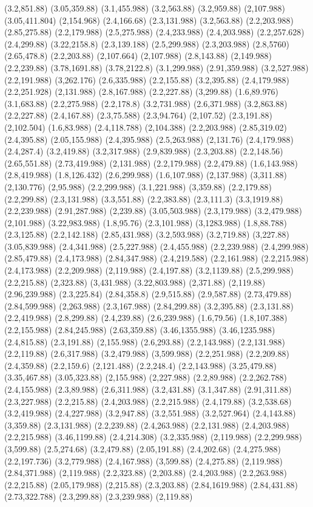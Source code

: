 \documentclass[12pt,letterpaper]{article}
\begin{document}
(3.2,851.88) (3.05,359.88) (3.1,455.988) (3.2,563.88) (3.2,959.88) (2,107.988) (3.05,411.804) (2,154.968) (2.4,166.68) (2.3,131.988) (3.2,563.88) (2.2,203.988) (2.85,275.88) (2.2,179.988) (2.5,275.988) (2.4,233.988) (2.4,203.988) (2.2,257.628) (2.4,299.88) (3.22,2158.8) (2.3,139.188) (2.5,299.988) (2.3,203.988) (2.8,5760) (2.65,478.8) (2.2,203.88) (2,107.664) (2,107.988) (2.8,143.88) (2,149.988) (2.2,239.88) (3.78,1691.88) (3.78,2122.8) (3.1,299.988) (2.91,359.988) (3.2,527.988) (2.2,191.988) (3,262.176) (2.6,335.988) (2.2,155.88) (3.2,395.88) (2.4,179.988) (2.2,251.928) (2,131.988) (2.8,167.988) (2.2,227.88) (3,299.88) (1.6,89.976) (3.1,683.88) (2.2,275.988) (2.2,178.8) (3.2,731.988) (2.6,371.988) (3.2,863.88) (2.2,227.88) (2.4,167.88) (2.3,75.588) (2.3,94.764) (2,107.52) (2.3,191.88) (2,102.504) (1.6,83.988) (2.4,118.788) (2,104.388) (2.2,203.988) (2.85,319.02) (2.4,395.88) (2.05,155.988) (2.4,395.988) (2.5,263.988) (2,131.76) (2.4,179.988) (2.4,287.4) (3.2,419.88) (3.2,317.988) (2.9,839.988) (2.3,203.88) (2.2,148.56) (2.65,551.88) (2.73,419.988) (2,131.988) (2.2,179.988) (2.2,479.88) (1.6,143.988) (2.8,419.988) (1.8,126.432) (2.6,299.988) (1.6,107.988) (2,137.988) (3,311.88) (2,130.776) (2,95.988) (2.2,299.988) (3.1,221.988) (3,359.88) (2.2,179.88) (2.2,299.88) (2.3,131.988) (3.3,551.88) (2.2,383.88) (2.3,111.3) (3.3,1919.88) (2.2,239.988) (2.91,287.988) (2,239.88) (3.05,503.988) (2.3,179.988) (3.2,479.988) (2,101.988) (3.22,983.988) (1.8,95.76) (2.3,101.988) (3,1283.988) (1.8,88.788) (2.3,125.88) (2.2,142.188) (2.85,431.988) (3.2,593.988) (3.2,719.88) (3,227.88) (3.05,839.988) (2.4,341.988) (2.5,227.988) (2.4,455.988) (2.2,239.988) (2.4,299.988) (2.85,479.88) (2.4,173.988) (2.84,347.988) (2.4,219.588) (2.2,161.988) (2.2,215.988) (2.4,173.988) (2.2,209.988) (2,119.988) (2.4,197.88) (3.2,1139.88) (2.5,299.988) (2.2,215.88) (2,323.88) (3,431.988) (3.22,803.988) (2,371.88) (2,119.88) (2.96,239.988) (2.3,225.84) (2.84,358.8) (2.9,515.88) (2.9,587.88) (2.73,479.88) (2.84,599.988) (2,263.988) (2.3,167.988) (2.84,299.88) (3.2,395.88) (2.3,131.88) (2.2,419.988) (2.8,299.88) (2.4,239.88) (2.6,239.988) (1.6,79.56) (1.8,107.388) (2.2,155.988) (2.84,245.988) (2.63,359.88) (3.46,1355.988) (3.46,1235.988) (2.4,815.88) (2.3,191.88) (2,155.988) (2.6,293.88) (2.2,143.988) (2.2,131.988) (2.2,119.88) (2.6,317.988) (3.2,479.988) (3,599.988) (2.2,251.988) (2.2,209.88) (2.4,359.88) (2.2,159.6) (2,121.488) (2.2,248.4) (2.2,143.988) (3.25,479.88) (3.35,467.88) (3.05,323.88) (2,155.988) (2,227.988) (2.2,89.988) (2.2,262.788) (2.4,155.988) (2.3,89.988) (2.6,311.988) (3.2,431.88) (3.1,347.88) (2.91,311.88) (2.3,227.988) (2.2,215.88) (2.4,203.988) (2.2,215.988) (2.4,179.88) (3.2,538.68) (3.2,419.988) (2.4,227.988) (3.2,947.88) (3.2,551.988) (3.2,527.964) (2.4,143.88) (3,359.88) (2.3,131.988) (2.2,239.88) (2.4,263.988) (2.2,131.988) (2.4,203.988) (2.2,215.988) (3.46,1199.88) (2.4,214.308) (3.2,335.988) (2,119.988) (2.2,299.988) (3,599.88) (2.5,274.68) (3.2,479.88) (2.05,191.88) (2.4,202.68) (2.4,275.988) (2.2,197.736) (3.2,779.988) (2.4,167.988) (3,599.88) (2.4,275.88) (2,119.988) (2.84,371.988) (2,119.988) (2.2,323.88) (2,203.88) (2.4,203.988) (2.2,263.988) (2.2,215.88) (2.05,179.988) (2,215.88) (2.3,203.88) (2.84,1619.988) (2.84,431.88) (2.73,322.788) (2.3,299.88) (2.3,239.988) (2,119.88) 
\end{document}
